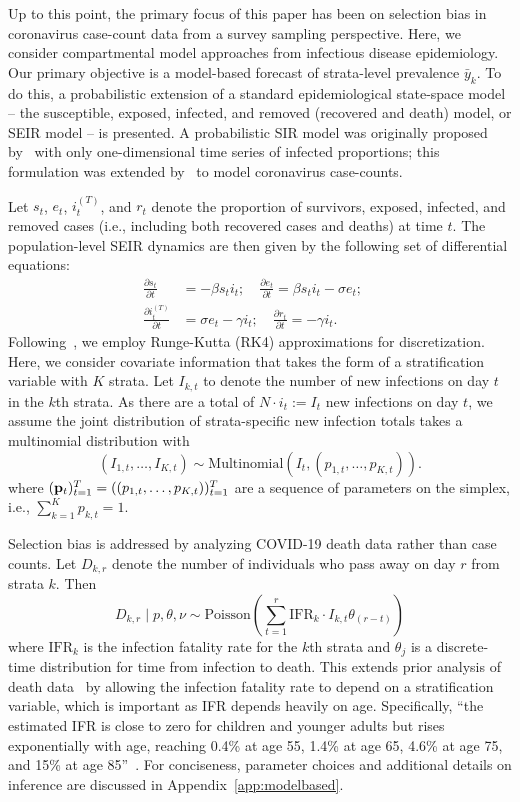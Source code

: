 \documentclass[11pt]{amsart}
\numberwithin{equation}{section}
\theoremstyle{plain}
\begin{document}
Up to this point, the primary focus of this paper has been on selection bias in coronavirus case-count data from a survey sampling perspective.  Here, we consider compartmental model approaches from infectious disease epidemiology.  Our primary objective is a model-based forecast of strata-level prevalence $\bar y_k$. To do this, a probabilistic extension of a standard epidemiological state-space model -- the susceptible, exposed, infected, and removed (recovered and death) model, or SEIR model -- is presented. A probabilistic SIR model was originally proposed by~\cite{Osthus2017} with only one-dimensional time series of infected proportions; this formulation was extended by~\cite{Song2020} to model coronavirus case-counts.

Let $s_t$, $e_t$, $i_t^{(T)}$, and $r_t$ denote the proportion of survivors, exposed, infected, and removed cases (i.e., including both recovered cases and deaths) at time $t$.  The population-level SEIR dynamics are then given by the following set of differential equations:
\begin{align}
\frac{\partial s_t}{\partial t} &= - \beta s_t i_t; \quad \frac{\partial e_t}{\partial t} = \beta s_t i_t - \sigma e_t; \quad \label{eq:seir} \\
\frac{\partial i^{(T)}_t}{\partial t} &= \sigma e_t - \gamma i_t; \quad
\frac{\partial r_t}{\partial t} = - \gamma i_t. \nonumber
\end{align}
Following~\cite{Song2020}, we employ Runge-Kutta (RK4) approximations for discretization. Here, we consider covariate information that takes the form of a stratification variable with $K$ strata.  Let $I_{k,t}$ to denote the number of new infections on day $t$ in the $k$th strata.  As there are a total of $N \cdot i_t := I_t$ new infections on day $t$, we assume the joint distribution of strata-specific new infection totals takes a multinomial distribution with
$$
( I_{1,t}, \ldots, I_{K,t} ) \sim \text{Multinomial} \left( I_t, (p_{1,t}, \ldots, p_{K, t}) \right).
$$
where $( {\bf p}_t )_{t=1}^T = ( (p_{1,t}, \ldots, p_{K, t}) )_{t=1}^T$ are a sequence of parameters on the simplex, i.e., $\sum_{k=1}^K p_{k,t} = 1$.

Selection bias is addressed by analyzing COVID-19 death data rather than case counts.  Let $D_{k,r}$ denote the number of individuals who pass away on day $r$ from strata $k$.  Then
$$
D_{k,r} \mid p, \theta, \nu \sim \text{Poisson} \left( \sum_{t=1}^r \text{IFR}_{k} \cdot I_{k,t} \theta_{(r-t)} \right)
$$
where $\text{IFR}_{k}$ is the infection fatality rate for the $k$th strata and $\theta_{j}$ is a discrete-time distribution for time from infection to death.  This extends prior analysis of death data~\cite{Johndrow2020} by allowing the infection fatality rate to depend on a stratification variable, which is important as IFR depends heavily on age.  Specifically, ``the estimated IFR is close to zero for children and younger adults but rises exponentially with age, reaching 0.4\% at age 55, 1.4\% at age 65, 4.6\% at age 75, and 15\% at age 85''~\cite{Levin2020}. For conciseness, parameter choices and additional details on inference are discussed in Appendix~\ref{app:modelbased}.
\end{document}
